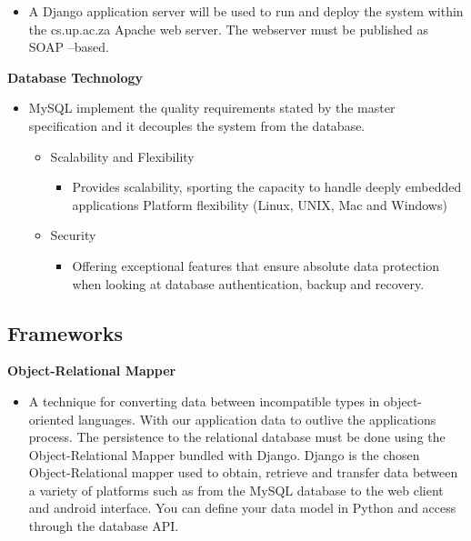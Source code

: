 \documentclass[12pt]{article}
\begin{document}
\begin{itemize}
\item A Django application server will be used to run and deploy the system within the cs.up.ac.za Apache web server. The webserver must be published as SOAP –based.

\end{itemize}                                
\indent\indent\linebreak \linebreak\textbf{Database Technology}
\begin{itemize}
\item MySQL implement the quality requirements stated by the master specification and it decouples the system from the database.
\begin{itemize}
\item Scalability and Flexibility
\begin{itemize}
\item Provides scalability, sporting the capacity to handle deeply embedded applications 
Platform flexibility (Linux, UNIX, Mac and Windows)
\end{itemize}
\item Security 
\begin{itemize}
\item  Offering exceptional features that ensure absolute data protection when looking at database authentication, backup and recovery.
\end{itemize}
\end{itemize}
\end{itemize} 
	
	\subsection{Frameworks}
\indent\indent \linebreak\linebreak\textbf{Object-Relational Mapper}
\begin{itemize}
\item A technique for converting data between incompatible types in object-oriented languages. With our application data to outlive the applications process. 
The persistence to the relational database must be done using the Object-Relational Mapper bundled with Django. Django is the chosen Object-Relational mapper used to obtain, retrieve and transfer data between a variety of platforms such as from the MySQL database to the web client and android interface. You can define your data model in Python and access through the database API.
\end{itemize}
\end{document}
